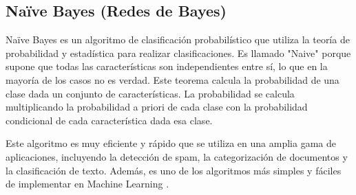 \doublespacing
\subsection{Naïve Bayes (Redes de Bayes)}
Naïve Bayes es un algoritmo de clasificación probabilístico que utiliza la teoría de probabilidad y estadística para realizar clasificaciones. Es llamado "Naive" porque supone que todas las características son independientes entre sí, lo que en la mayoría de los casos no es verdad. Este teorema calcula la probabilidad de una clase dada un conjunto de características. La probabilidad se calcula multiplicando la probabilidad a priori de cada clase con la probabilidad condicional de cada característica dada esa clase\cite{Vembandasamy2015}. \\
\par Este algoritmo es muy eficiente y rápido que se utiliza en una amplia gama de aplicaciones, incluyendo la detección de spam, la categorización de documentos y la clasificación de texto. Además, es uno de los algoritmos más simples y fáciles de implementar en Machine Learning \cite{Vembandasamy2015}.\\


